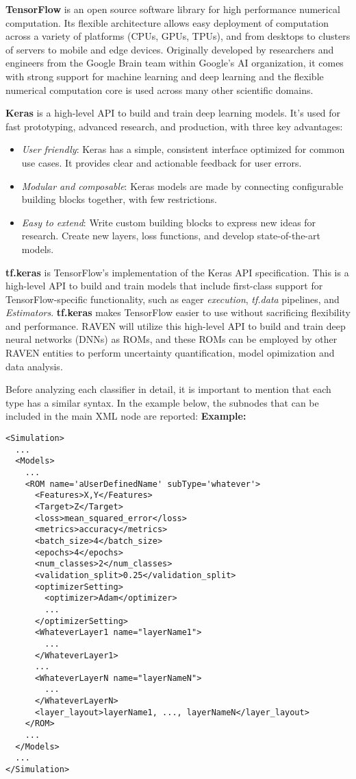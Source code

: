 \textbf{TensorFlow} is an open source software library for high performance numerical computation. Its flexible architecture
allows easy deployment of computation across a variety of platforms (CPUs, GPUs, TPUs), and from desktops to clusters
of servers to mobile and edge devices. Originally developed by researchers and engineers from the Google Brain team
within Google’s AI organization, it comes with strong support for machine learning and deep learning and the flexible
numerical computation core is used across many other scientific domains.

\textbf{Keras} is a high-level API to build and train deep learning models. It's used for fast prototyping, advanced research,
and production, with three key advantages:
\begin{itemize}
  \item \textit{User friendly}: Keras has a simple, consistent interface optimized for common use cases.
    It provides clear and actionable feedback for user errors.
  \item \textit{Modular and composable}: Keras models are made by connecting configurable building blocks together,
    with few restrictions.
  \item \textit{Easy to extend}: Write custom building blocks to express new ideas for research. Create new layers,
    loss functions, and develop state-of-the-art models.
\end{itemize}

\textbf{tf.keras} is TensorFlow's implementation of the Keras API specification. This is a high-level API to build and train
models that include first-class support for TensorFlow-specific functionality, such as eager \textit{execution},
\textit{tf.data} pipelines, and \textit{Estimators}. \textbf{tf.keras} makes TensorFlow easier to use without sacrificing
flexibility and performance. RAVEN will utilize this high-level API to build and train deep neural networks (DNNs) as ROMs, and
these ROMs can be employed by other RAVEN entities to perform uncertainty quantification, model opimization and data analysis.

Before analyzing each classifier in detail, it is important to mention that each type has a similar syntax. In the
example below, the subnodes that can be included in the main XML node  are reported:
\textbf{Example:}
\begin{lstlisting}[style=XML,morekeywords={name,subType}]
<Simulation>
  ...
  <Models>
    ...
    <ROM name='aUserDefinedName' subType='whatever'>
      <Features>X,Y</Features>
      <Target>Z</Target>
      <loss>mean_squared_error</loss>
      <metrics>accuracy</metrics>
      <batch_size>4</batch_size>
      <epochs>4</epochs>
      <num_classes>2</num_classes>
      <validation_split>0.25</validation_split>
      <optimizerSetting>
        <optimizer>Adam</optimizer>
        ...
      </optimizerSetting>
      <WhateverLayer1 name="layerName1">
        ...
      </WhateverLayer1>
      ...
      <WhateverLayerN name="layerNameN">
        ...
      </WhateverLayerN>
      <layer_layout>layerName1, ..., layerNameN</layer_layout>
    </ROM>
    ...
  </Models>
  ...
</Simulation>
\end{lstlisting}

